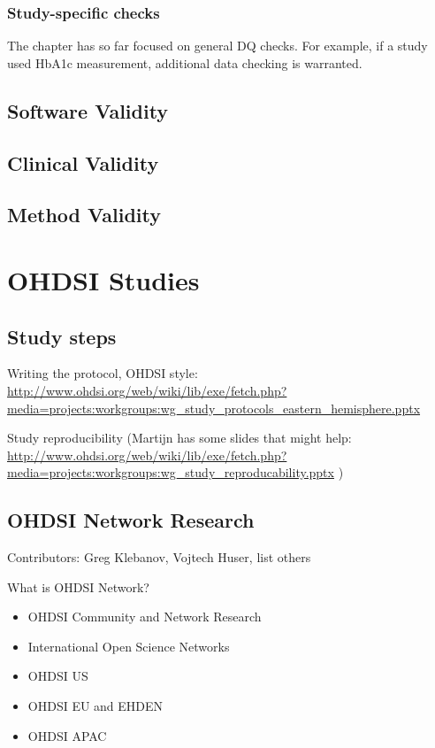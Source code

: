 \documentclass[]{book}
\providecommand{\tightlist}{%
  \setlength{\itemsep}{0pt}\setlength{\parskip}{0pt}}
\begin{document}
\section{Study-specific checks}\label{study-specific-checks}

The chapter has so far focused on general DQ checks. For example, if a
study used HbA1c measurement, additional data checking is warranted.

\chapter{Software Validity}\label{SoftwareValidity}

\chapter{Clinical Validity}\label{ClinicalValidity}

\chapter{Method Validity}\label{MethodValidity}

\part{OHDSI Studies}\label{part-ohdsi-studies}

\chapter{Study steps}\label{StudySteps}

Writing the protocol, OHDSI style:
\url{http://www.ohdsi.org/web/wiki/lib/exe/fetch.php?media=projects:workgroups:wg_study_protocols_eastern_hemisphere.pptx}

Study reproducibility (Martijn has some slides that might help:
\url{http://www.ohdsi.org/web/wiki/lib/exe/fetch.php?media=projects:workgroups:wg_study_reproducability.pptx}
)

\chapter{OHDSI Network Research}\label{NetworkResearch}

Contributors: Greg Klebanov, Vojtech Huser, list others

What is OHDSI Network?

\begin{itemize}
\tightlist
\item
  OHDSI Community and Network Research
\item
  International Open Science Networks
\item
  OHDSI US
\item
  OHDSI EU and EHDEN
\item
  OHDSI APAC
\end{itemize}
\end{document}
